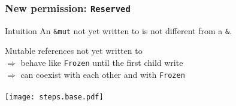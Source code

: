 \begin{frame}[t]
    \frametitle{New permission: \texttt{Reserved}}
    \begin{exampleblock}{Intuition}
        An \texttt{\&mut} not yet written to is not different from a \texttt{\&}.
    \end{exampleblock}

    Mutable references not yet written to\\
    \(\Rightarrow\) behave like \texttt{Frozen} until the first child write\\
    \(\Rightarrow\) can coexist with each other and with \texttt{Frozen}~\\~\\

    \texttt{[image: steps.base.pdf]}
\end{frame}

